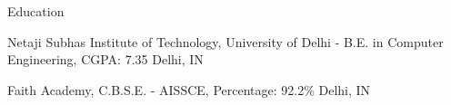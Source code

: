 \documentclass[../resume.tex]{subfiles}
\begin{document}
\begin{rSection}{ Education }

\rSubsectionHeading
    {Netaji Subhas Institute of Technology, \nem University of Delhi}
    {  -  }
    {\normalfont B.E. in Computer Engineering, CGPA: 7.35}
    {Delhi, IN}

\rSubsectionHeading
    {Faith Academy, \nem C.B.S.E.}
    {  -  }
    {\normalfont AISSCE, Percentage: 92.2\%}
    {Delhi, IN}

\end{rSection}
\end{document}
